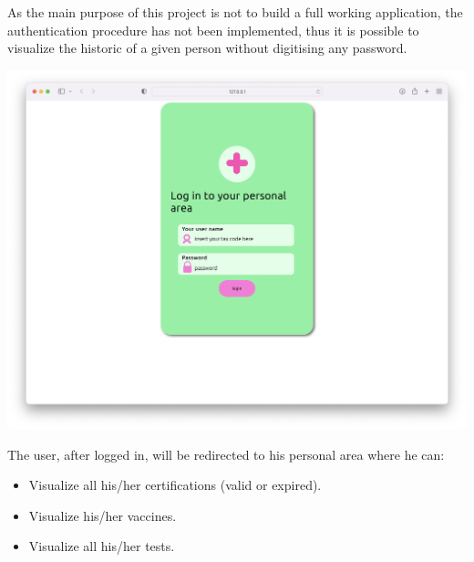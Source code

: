 \documentclass{article}
\begin{document}
As the main purpose of this project is not to build a full working application, the authentication procedure has not been implemented, thus it is possible to visualize the historic of a given person without
digitising any password.
\begin{center}
\includegraphics[scale=0.23]{login.png}
\end{center}
The user, after logged in, will be redirected to his personal area where he can:
\begin{itemize}
    \item Visualize all his/her certifications (valid or expired).
    \item Visualize his/her vaccines.
    \item Visualize all his/her tests.
\end{itemize}
\end{document}
